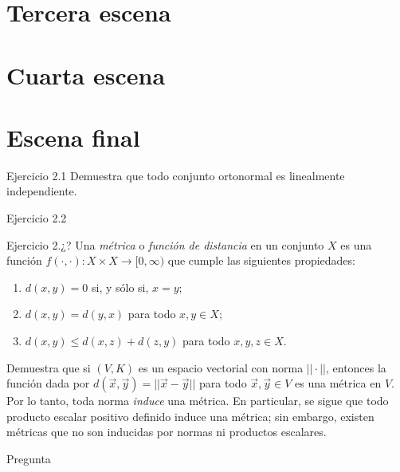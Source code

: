 \documentclass[12pt,dvipsnames]{article}
\numberwithin{equation}{section}
\begin{document}

\newpage
\section{Tercera escena}


\newpage
\section{Cuarta escena}


\newpage
\section{Escena final}


Ejercicio 2.1 Demuestra que todo conjunto ortonormal es linealmente independiente.

\vspace{5mm}
Ejercicio 2.2

\vspace{5mm}
Ejercicio 2.¿? Una \emph{métrica} o \emph{función de distancia} en un conjunto $X$ es una función $f(\cdot, \cdot ):X\times X\to [0,\infty)$ que cumple las siguientes propiedades:
\begin{enumerate}[label=(\roman*)]
    \item $d(x,y)=0$ si, y sólo si, $x=y$;

    \item $d(x,y)=d(y,x)$ para todo $x,y\in X$;

    \item $d(x,y) \le d(x,z) + d(z,y)$ para todo $x,y,z\in X$.
\end{enumerate}

\noindent Demuestra que si $(V,K)$ es un espacio vectorial con norma $||\cdot||$, entonces la función dada por $d(\vec{x},\vec{y})=||\vec{x}-\vec{y}||$ para todo $\vec{x},\vec{y}\in V$ es una métrica en $V$. Por lo tanto, toda norma \emph{induce} una métrica. En particular, se sigue que todo producto escalar positivo definido induce una métrica; sin embargo, existen métricas que no son inducidas por normas ni productos escalares.

\vspace{5mm}
Pregunta 
\end{document}
